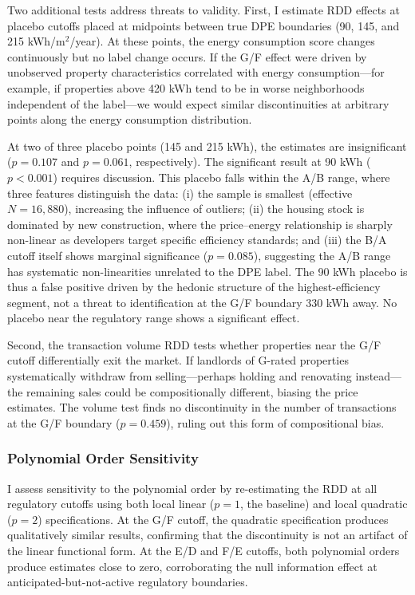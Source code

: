 \documentclass[12pt]{article}
\begin{document}
Two additional tests address threats to validity. First, I estimate RDD effects at placebo cutoffs placed at midpoints between true DPE boundaries (90, 145, and 215 kWh/m$^2$/year). At these points, the energy consumption score changes continuously but no label change occurs. If the G/F effect were driven by unobserved property characteristics correlated with energy consumption---for example, if properties above 420 kWh tend to be in worse neighborhoods independent of the label---we would expect similar discontinuities at arbitrary points along the energy consumption distribution.

At two of three placebo points (145 and 215 kWh), the estimates are insignificant ($p = 0.107$ and $p = 0.061$, respectively). The significant result at 90 kWh ($p < 0.001$) requires discussion. This placebo falls within the A/B range, where three features distinguish the data: (i) the sample is smallest (effective $N = 16{,}880$), increasing the influence of outliers; (ii) the housing stock is dominated by new construction, where the price--energy relationship is sharply non-linear as developers target specific efficiency standards; and (iii) the B/A cutoff itself shows marginal significance ($p = 0.085$), suggesting the A/B range has systematic non-linearities unrelated to the DPE label. The 90 kWh placebo is thus a false positive driven by the hedonic structure of the highest-efficiency segment, not a threat to identification at the G/F boundary 330 kWh away. No placebo near the regulatory range shows a significant effect.

Second, the transaction volume RDD tests whether properties near the G/F cutoff differentially exit the market. If landlords of G-rated properties systematically withdraw from selling---perhaps holding and renovating instead---the remaining sales could be compositionally different, biasing the price estimates. The volume test finds no discontinuity in the number of transactions at the G/F boundary ($p = 0.459$), ruling out this form of compositional bias.

\subsubsection{Polynomial Order Sensitivity}

I assess sensitivity to the polynomial order by re-estimating the RDD at all regulatory cutoffs using both local linear ($p=1$, the baseline) and local quadratic ($p=2$) specifications. At the G/F cutoff, the quadratic specification produces qualitatively similar results, confirming that the discontinuity is not an artifact of the linear functional form. At the E/D and F/E cutoffs, both polynomial orders produce estimates close to zero, corroborating the null information effect at anticipated-but-not-active regulatory boundaries.
\end{document}
